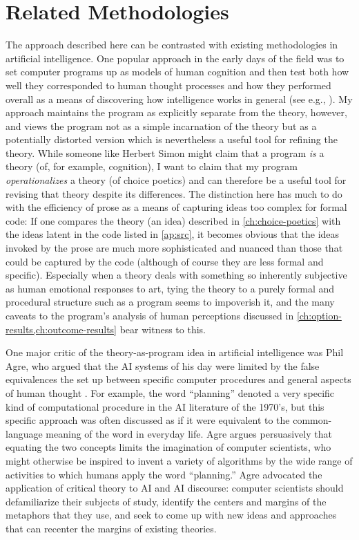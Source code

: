 \section{Related Methodologies}

The approach described here can be contrasted with existing methodologies in artificial intelligence.
%
One popular approach in the early days of the field was to set computer programs up as models of human cognition and then test both how well they corresponded to human thought processes and how they performed overall as a means of discovering how intelligence works in general (see e.g., \citep{Newell1976,Simon2006}).
%
My approach maintains the program as explicitly separate from the theory, however, and views the program not as a simple incarnation of the theory but as a potentially distorted version which is nevertheless a useful tool for refining the theory.
%
While someone like Herbert Simon might claim that a program \emph{is} a theory (of, for example, cognition), I want to claim that my program \emph{operationalizes} a theory (of choice poetics) and can therefore be a useful tool for revising that theory despite its differences.
%
The distinction here has much to do with the efficiency of prose as a means of capturing ideas too complex for formal code: If one compares the theory (an idea) described in \cref{ch:choice-poetics} with the ideas latent in the code listed in \cref{ap:src}, it becomes obvious that the ideas invoked by the prose are much more sophisticated and nuanced than those that could be captured by the code (although of course they are less formal and specific).
%
Especially when a theory deals with something so inherently subjective as human emotional responses to art, tying the theory to a purely formal and procedural structure such as a program seems to impoverish it, and the many caveats to the program's analysis of human perceptions discussed in \cref{ch:option-results,ch:outcome-results} bear witness to this.


One major critic of the theory-as-program idea in artificial intelligence was Phil Agre, who argued that the AI systems of his day were limited by the false equivalences the set up between specific computer procedures and general aspects of human thought \citep{Agre1997}.
%
For example, the word ``planning'' denoted a very specific kind of computational procedure in the AI literature of the 1970's, but this specific approach was often discussed as if it were equivalent to the common-language meaning of the word in everyday life.
%
Agre argues persuasively that equating the two concepts limits the imagination of computer scientists, who might otherwise be inspired to invent a variety of algorithms by the wide range of activities to which humans apply the word ``planning.''
%
Agre advocated the application of critical theory to AI and AI discourse: computer scientists should defamiliarize their subjects of study, identify the centers and margins of the metaphors that they use, and seek to come up with new ideas and approaches that can recenter the margins of existing theories.


